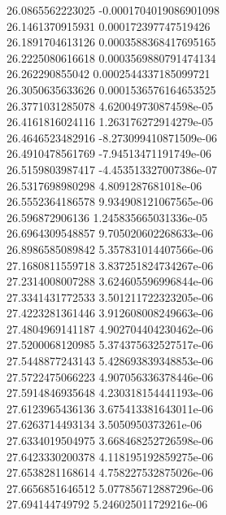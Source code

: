 {26.0865562223025 -0.0001704019086901098 \\
26.1461370915931 0.000172397747519426 \\
26.1891704613126 0.0003588368417695165 \\
26.2225080616618 0.0003569880791474134 \\
26.262290855042 0.0002544337185099721 \\
26.3050635633626 0.0001536576164653525 \\
26.3771031285078 4.620049730874598e-05 \\
26.4161816024116 1.263176272914279e-05 \\
26.4646523482916 -8.273099410871509e-06 \\
26.4910478561769 -7.94513471191749e-06 \\
26.5159803987417 -4.453513327007386e-07 \\
26.5317698980298 4.8091287681018e-06 \\
26.5552364186578 9.934908121067565e-06 \\
26.596872906136 1.245835665031336e-05 \\
26.6964309548857 9.705020602268633e-06 \\
26.8986585089842 5.357831014407566e-06 \\
27.1680811559718 3.837251824734267e-06 \\
27.2314008007288 3.624605596996844e-06 \\
27.3341431772533 3.501211722323205e-06 \\
27.4223281361446 3.912608008249663e-06 \\
27.4804969141187 4.902704404230462e-06 \\
27.5200068120985 5.374375632527517e-06 \\
27.5448877243143 5.428693839348853e-06 \\
27.5722475066223 4.907056336378446e-06 \\
27.5914846935648 4.230318154441193e-06 \\
27.6123965436136 3.675413381643011e-06 \\
27.6263714493134 3.5050950373261e-06 \\
27.6334019504975 3.668468252726598e-06 \\
27.6423330200378 4.118195192859275e-06 \\
27.6538281168614 4.758227532875026e-06 \\
27.6656851646512 5.077856712887296e-06 \\
27.694144749792 5.246025011729216e-06 \\
}
